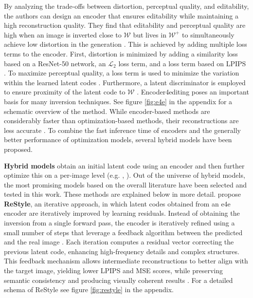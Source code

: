  By analyzing the trade-offs between distortion, perceptual quality, and editability, the authors can design an encoder that ensures editability while maintaining a high reconstruction quality. They find that editability and perceptual quality are high when an image is inverted close to $\mathcal{W}$ but lives in $\mathcal{W^+}$ to simultaneously achieve low distortion in the generation \citep[p.2]{tov2021designing}. This is achieved by adding multiple loss terms to the encoder. First, distortion is minimized by adding a similarity loss based on a ResNet-50 \citep{he2016deep} network, an $\mathcal{L}_2$ loss term, and a loss term based on LPIPS \citep{zhang2018unreasonable}. To maximize perceptual quality, a loss term is used to minimize the variation within the learned latent codes \citep[p.5]{tov2021designing}. Furthermore, a latent discriminator \citep{nitzan2020face} is employed to ensure proximity of the latent code to $\mathcal{W}$ \citep[p.5]{tov2021designing}. Encoder4editing poses an important basis for many inversion techniques. See figure \ref{fig:e4e} in the appendix for a schematic overview of the method. While encoder-based methods are considerably faster than optimization-based methods, their reconstructions are less accurate \citep[p.10]{bermano2022state}. To combine the fast inference time of encoders and the generally better performance of optimization models, several hybrid models have been proposed.


\textbf{Hybrid models} obtain an initial latent code using an encoder and then further optimize this on a per-image level (e.g. \cite{zhu2016generative}, \cite{zhu2020domain}). Out of the universe of hybrid models, the most promising models based on the overall literature have been selected and tested in this work. These methods are explained below in more detail. \cite{alaluf2021restyle} propose \textbf{ReStyle}, an iterative approach, in which latent codes obtained from an e4e encoder are iteratively improved by learning residuals. Instead of obtaining the inversion from a single forward pass, the encoder is iteratively refined using a small number of steps that leverage a feedback algorithm between the predicted and the real image \citep[p.2]{alaluf2021restyle}. Each iteration computes a residual vector correcting the previous latent code, enhancing high-frequency details and complex structures.  This feedback mechanism allows intermediate reconstructions to better align with the target image, yielding lower LPIPS and MSE scores, while preserving semantic consistency and producing visually coherent results \citep[p.6]{alaluf2021restyle}. For a detailed schema of ReStyle see figure \ref{fig:restyle} in the appendix.

